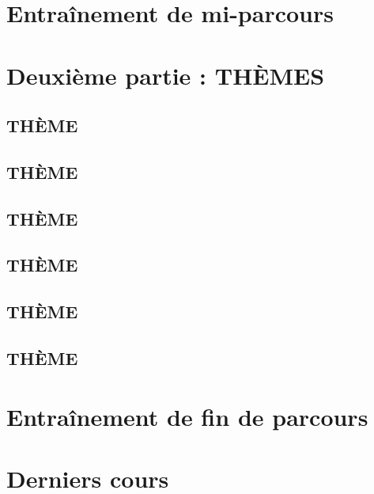 \documentclass[poly,trombi]{valbonne}
\begin{document}
\section{Entraînement de mi-parcours}


\section{Deuxième partie : THÈMES}

\subsection{THÈME}


\subsection{THÈME}


\subsection{THÈME}


\subsection{THÈME}


\subsection{THÈME}


\subsection{THÈME}


\section{Entraînement de fin de parcours}


\section{Derniers cours}
\end{document}
